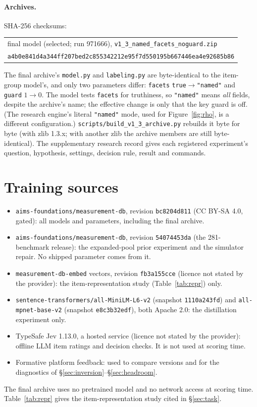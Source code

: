 \documentclass{article}
\begin{document}
\paragraph{Archives.} SHA-256 checksums:\\[2pt]
{\footnotesize\begin{tabular}{@{}l@{}}
final model (selected; run 971666), \texttt{v1\_3\_named\_facets\_noguard.zip}\\
\quad\texttt{a4b0e841d4a344ff207bed2c855342212e95f7d550195b667446ea4e92685b86}\\
\end{tabular}}\par\medskip
The final archive's \texttt{model.py} and \texttt{labeling.py} are byte-identical to the item-group model's, and only
two parameters differ: \texttt{facets} \texttt{true}$\to$\texttt{"named"} and \texttt{guard} $1\to0$. The model tests
\texttt{facets} for truthiness, so \texttt{"named"} means \emph{all} fields, despite the archive's name; the effective
change is only that the key guard is off. (The research engine's literal \texttt{"named"} mode, used for
Figure~\ref{fig:rho}, is a different configuration.) \texttt{scripts/build\_v1\_3\_archive.py} rebuilds it byte for
byte (with zlib 1.3.x; with another zlib the archive members are still byte-identical). The supplementary
research record gives each registered experiment's question, hypothesis, settings, decision rule, result and commands.

\section{Training sources}\label{app:sources}
\begin{itemize}[leftmargin=*,nosep,before=\raggedright]
  \item \texttt{aims-foundations/measurement-db}, revision \texttt{bc8204d811} (CC BY-SA 4.0, gated): all models and
    parameters, including the final archive.
  \item \texttt{aims-foundations/measurement-db}, revision \texttt{54074453da} (the 281-benchmark release): the
    expanded-pool prior experiment and the simulator repair. No shipped parameter comes from it.
  \item \texttt{measurement-db-embed} vectors, revision \texttt{fb3a155cce} (licence not stated by the provider): the
    item-representation study (Table~\ref{tab:repr}) only.
  \item \texttt{sentence-transformers/all-MiniLM-L6-v2} (snapshot \texttt{1110a243fd}) and \texttt{all-mpnet-base-v2}
    (snapshot \texttt{e8c3b32edf}), both Apache 2.0: the distillation experiment only.
  \item TypeSafe Jev 1.13.0, a hosted service (licence not stated by the provider): offline LLM item ratings and
    decision checks. It is not used at scoring time.
  \item Formative platform feedback: used to compare versions and for the diagnostics of
    \S\ref{sec:inversion}--\S\ref{sec:headroom}.
\end{itemize}
The final archive uses no pretrained model and no network access at scoring time. Table~\ref{tab:repr} gives the
item-representation study cited in \S\ref{sec:task}.
\end{document}
